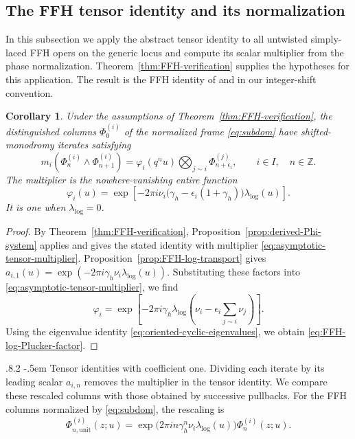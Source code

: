 \documentclass[11pt,leqno]{amsart}
\makeatletter
\numberwithin{equation}{section}
\renewcommand\paragraph{\@startsection{paragraph}{4}{\z@}%
  {.8\baselineskip \@plus .2\baselineskip}%
  {-.5em}%
  {\normalfont\normalsize\bfseries}}
\theoremstyle{plain}
\newtheorem{corollary}[theorem]{Corollary}
\theoremstyle{definition}
\theoremstyle{plain}
\theoremstyle{definition}
\theoremstyle{remark}
\makeatother
\begin{document}
\subsection{The FFH tensor identity and its normalization}\label{sec:FFH-Phi-verification}
In this subsection we apply the abstract tensor identity to all untwisted simply-laced FFH opers on the generic locus and compute its scalar multiplier from the phase normalization.  Theorem~\ref{thm:FFH-verification} supplies the hypotheses for this application.  The result is the FFH identity of \cite[Proposition~3.22]{MR2024} and \cite[Theorem~3.6]{MRV2016} in our integer-shift convention.
\begin{corollary}\label{prop:FFH-integral-Phi-system}
Under the assumptions of Theorem~\ref{thm:FFH-verification}, the distinguished columns $\Phi_0^{(i)}$ of the normalized frame \eqref{eq:subdom} have shifted-monodromy iterates satisfying
\begin{equation}\label{eq:FFH-integral-Phi-system}
 m_i\!\left(\Phi_n^{(i)}\wedge\Phi_{n+1}^{(i)}\right)
 =\varphi_i(q^nu)\bigotimes_{j\sim i}\Phi_{n+\epsilon_i}^{(j)},
 \qquad i\in I,\quad n\in\mathbb Z.
\end{equation}
The multiplier is the nowhere-vanishing entire function
\begin{equation}\label{eq:FFH-log-Plucker-factor}
 \varphi_i(u)=\exp\!\left[-2\pi i\nu_i
   \bigl(\gamma_h-\epsilon_i(1+\gamma_h)\bigr)\lambda_{\log}(u)\right].
\end{equation}
It is one when $\lambda_{\log}=0$.
\end{corollary}
\begin{proof}
By Theorem~\ref{thm:FFH-verification}, Proposition~\ref{prop:derived-Phi-system} applies and gives the stated identity with multiplier \eqref{eq:asymptotic-tensor-multiplier}.  Proposition~\ref{prop:FFH-log-transport} gives $a_{i,1}(u)=\exp(-2\pi i\gamma_h\nu_i\lambda_{\log}(u))$.
Substituting these factors into \eqref{eq:asymptotic-tensor-multiplier}, we find
\[
 \varphi_i=\exp\!\left[-2\pi i\gamma_h\lambda_{\log}
           \left(\nu_i-\epsilon_i\sum_{j\sim i}\nu_j\right)\right].
\]
Using the eigenvalue identity \eqref{eq:oriented-cyclic-eigenvalues}, we obtain \eqref{eq:FFH-log-Plucker-factor}.
\end{proof}

\paragraph{Tensor identities with coefficient one.}
Dividing each iterate by its leading scalar $a_{i,n}$ removes the multiplier in the tensor identity.  We compare these rescaled columns with those obtained by successive pullbacks.  For the FFH columns normalized by \eqref{eq:subdom}, the rescaling is
\begin{equation}\label{eq:FFH-unit-normalized-orbit}
 \Phi_{n,\mathrm{unit}}^{(i)}(z;u)
 =\exp\bigl(2\pi i n\gamma_h^n\nu_i\lambda_{\log}(u)\bigr)
   \Phi_n^{(i)}(z;u).
\end{equation}
\end{document}
